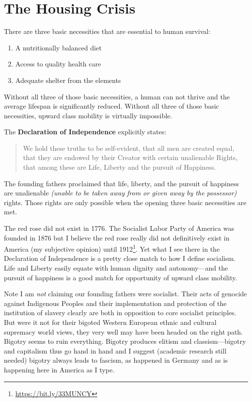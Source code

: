 \section{The Housing Crisis}

There are three basic necessities that are essential to human survival:

\begin{enumerate}
\item A nutritionally balanced diet
\item Access to quality health care
\item Adequate shelter from the elements
\end{enumerate}

Without all three of those basic necessities, a human can not thrive and the average lifespan is significantly reduced. Without all three of those basic necessities, upward class mobility is virtually impossible.

The \textbf{Declaration of Independence} explicitly states:

\begin{quote}
{\selectfont\large%
We hold these truths to be self-evident, that all men are created equal, that they are endowed by their Creator with certain unalienable Rights, that among these are Life, Liberty and the pursuit of Happiness.}
\end{quote}

The founding fathers proclaimed that life, liberty, and the pursuit of happiness are unalienable \emph{(unable to be taken away from or given away by the possessor)} rights. Those rights are only possible when the opening three basic necessities are met.

The red rose did not exist in 1776. The Socialist Labor Party of America was founded in 1876 but I believe the red rose really did not definitively exist in America (my subjective opinion) until 1912\footnote{\url{https://bit.ly/33MUNCY}}. Yet what I see there in the Declaration of Independence is a pretty close match to how I define socialism. Life and Liberty easily equate with human dignity and autonomy---and the pursuit of happiness is a good match for opportunity of upward class mobility.

Note I am \emph{not} claiming our founding fathers were socialist. Their acts of genocide against Indigenous Peoples and their implementation and protection of the institution of slavery clearly are both in opposition to core socialist principles. But were it not for their bigoted Western European ethnic and cultural supremacy world views, they very well may have been headed on the right path. Bigotry seems to ruin everything. Bigotry produces elitism and classism---bigotry and capitalism thus go hand in hand and I suggest (academic research still needed) bigotry always leads to fascism, as happened in Germany and as is happening here in America as I type.

